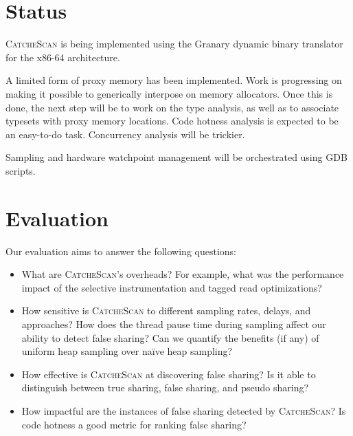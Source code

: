 \documentclass{sig-alternate}
\newcommand{\TextToolname}{CatcheScan}
\newcommand{\Toolname}{\textsc{\TextToolname{}}}
\begin{document}
\section{Status}\label{sec:status}
\Toolname{} is being implemented using the Granary dynamic binary translator \cite{Granary} for the x86-64 architecture.

A limited form of proxy memory has been implemented. Work is progressing on making it possible to generically interpose
on memory allocators. Once this is done, the next step will be to work on the type analysis, as well as to associate typesets
with proxy memory locations. Code hotness analysis is expected to be an easy-to-do task. Concurrency analysis will be trickier.

Sampling and hardware watchpoint management will be orchestrated using GDB scripts.


\section{Evaluation}\label{sec:evaluation}
Our evaluation aims to answer the following questions:
\begin{itemize}
\item What are \Toolname{}'s overheads? For example, what was the performance impact of the selective instrumentation
and tagged read optimizations?

\item How sensitive is \Toolname{} to different sampling rates, delays, and approaches? How does the thread
pause time during sampling affect our ability to detect false sharing? Can we quantify the benefits (if any) of
uniform heap sampling over na{\"i}ve heap sampling?

\item How effective is \Toolname{} at discovering false sharing? Is it able to distinguish between true sharing, false sharing,
and pseudo sharing?

\item How impactful are the instances of false sharing detected by \Toolname{}? Is code hotness a good metric for ranking
false sharing?
\end{itemize}
\end{document}

